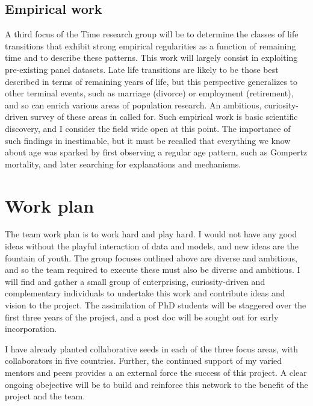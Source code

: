 \documentclass[a4paper,12pt]{article}
\begin{document}
\subsection{Empirical work}
A third focus of the Time research group will be to determine the classes of
life transitions that exhibit strong empirical regularities as a function
of remaining time and to describe these patterns. This work will largely consist
in exploiting pre-existing panel datasets. Late life transitions are likely to
be those best described in terms of remaining years of life, but this
perspective generalizes to other terminal events, such as marriage (divorce) or
employment (retirement), and so can enrich various areas of population
research. An ambitious, curiosity-driven survey of these areas in called for.
Such empirical work is basic scientific discovery, and I consider the field wide
open at this point. The importance of such findings in inestimable, but it must
be recalled that everything we know about age was sparked by first observing a
regular age pattern, such as Gompertz mortality, and later
searching for explanations and mechanisms.

\pagebreak
\section{Work plan}
The team work plan is to work hard and play hard. I would not have any
good ideas without the playful interaction of data and models, and new ideas
are the fountain of youth. The group focuses outlined above are diverse and
ambitious, and so the team required to execute these must also be diverse and
ambitious. I will find and gather a small group of enterprising, curiosity-driven and complementary individuals to undertake this work and contribute ideas and vision to the project. The assimilation of PhD students will be staggered over the first three years of the project, and a post doc will be sought out for early incorporation.

I have already planted collaborative seeds in each of the three focus areas,
with collaborators in five countries. Further, the continued
support of my varied mentors and peers provides a an external force
the success of this project. A clear ongoing obejective will be to build and
reinforce this network to the benefit of the project and the team. 
\end{document}
